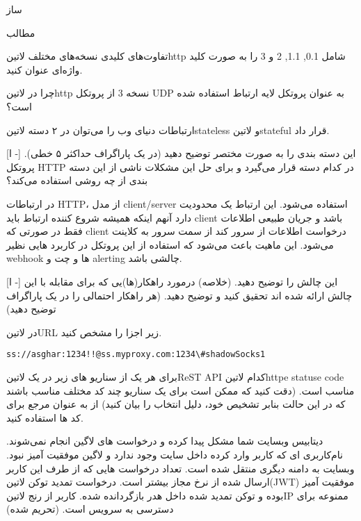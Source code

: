 \documentclass{../assignment}
\begin{document}
‌ساز

‌مطالب



تفاوت‌های کلیدی نسخه‌های مختلف ‌لاتین{http} شامل 0.1, 1.1, 2 و 3 را به صورت کلید واژه‌ای عنوان کنید.

چرا در ‌لاتین{http} نسخه 3 از پروتکل UDP به عنوان پروتکل لایه ارتباط استفاده شده است؟


ارتباطات دنیای وب را می‌توان در ۲ دسته ‌لاتین{stateless} و ‌لاتین{stateful} قرار داد.

[ا -]
 این دسته بندی را به صورت مختصر توضیح دهید (در یک پاراگراف حداکثر ۵ خطی).
 پروتکل HTTP در کدام دسته قرار می‌گیرد و برای حل این مشکلات ناشی از این دسته بندی از چه روشی استفاده می‌کند؟


در ارتباطات HTTP، از مدل client/server استفاده می‌شود. این ارتباط یک محدودیت دارد آنهم اینکه همیشه شروع کننده ارتباط باید client باشد و جریان طبیعی اطلاعات فقط در صورتی که client درخواست اطلاعات از سرور کند از سمت سرور به کلاینت می‌شود. این ماهیت باعث می‌شود که استفاده از این پروتکل در کاربرد هایی نظیر webhook ها و چت و alerting چالشی باشد.

[ا -]
 این چالش را توضیح دهید. (خلاصه)
 درمورد راهکار(ها)یی که برای مقابله با این چالش ارائه شده اند تحقیق کنید و توضیح دهید. (هر راهکار احتمالی را در یک پاراگراف توضیح دهید)


در ‌لاتین{URL} زیر اجزا را مشخص کنید.

\begin{latin}
\begin{verbatim}
ss://asghar:1234!!@ss.myproxy.com:1234\#shadowSocks1
\end{verbatim}
\end{latin}

برای هر یک از سناریو های زیر در یک ‌لاتین{ReST API} کدام ‌لاتین{httpe statuse code} مناسب است.
(دقت کنید که ممکن است برای یک سناریو چند کد مختلف مناسب باشند که در این حالت بنابر تشخیص خود، دلیل انتخاب را بیان کنید)
از  به عنوان مرجع برای کد ها استفاده کنید.

 دیتابیس وبسایت شما مشکل پیدا کرده و درخواست های لاگین انجام نمی‌شوند.
 نام‌کاربری ای که کاربر وارد کرده داخل سایت وجود ندارد و لاگین موفقیت آمیز نبود.
 وبسایت به دامنه دیگری منتقل شده است.
 تعداد درخواست هایی که از طرف این کاربر ارسال شده از نرخ مجاز بیشتر است.
 درخواست تمدید توکن ‌لاتین{(JWT)} موفقیت آمیز بوده و توکن تمدید شده داخل هدر بازگردانده شده.
 کاربر از رنج ‌لاتین{IP} ممنوعه برای دسترسی به سرویس است. (تحریم شده)
\end{document}
